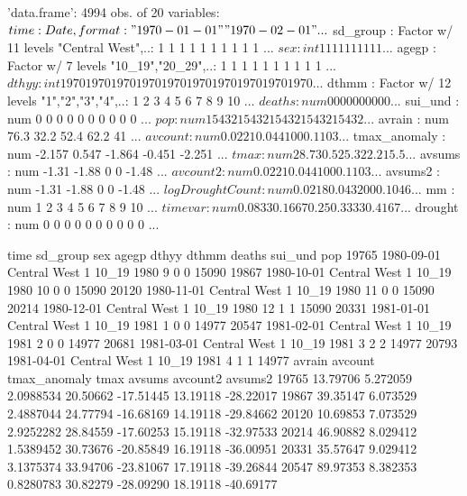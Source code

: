\documentclass[a4paper]{article}                %
\begin{document}
\begin{Schunk}
\begin{Soutput}
'data.frame':	4994 obs. of  20 variables:
 $ time           : Date, format: "1970-01-01" "1970-02-01" ...
 $ sd_group       : Factor w/ 11 levels "Central West",..: 1 1 1 1 1 1 1 1 1 1 ...
 $ sex            : int  1 1 1 1 1 1 1 1 1 1 ...
 $ agegp          : Factor w/ 7 levels "10_19","20_29",..: 1 1 1 1 1 1 1 1 1 1 ...
 $ dthyy          : int  1970 1970 1970 1970 1970 1970 1970 1970 1970 1970 ...
 $ dthmm          : Factor w/ 12 levels "1","2","3","4",..: 1 2 3 4 5 6 7 8 9 10 ...
 $ deaths         : num  0 0 0 0 0 0 0 0 0 0 ...
 $ sui_und        : num  0 0 0 0 0 0 0 0 0 0 ...
 $ pop            : num  15432 15432 15432 15432 15432 ...
 $ avrain         : num  76.3 32.2 52.4 62.2 41 ...
 $ avcount        : num  0.0221 0.0441 0 0 0.1103 ...
 $ tmax_anomaly   : num  -2.157 0.547 -1.864 -0.451 -2.251 ...
 $ tmax           : num  28.7 30.5 25.3 22.2 15.5 ...
 $ avsums         : num  -1.31 -1.88 0 0 -1.48 ...
 $ avcount2       : num  0.0221 0.0441 0 0 0.1103 ...
 $ avsums2        : num  -1.31 -1.88 0 0 -1.48 ...
 $ logDroughtCount: num  0.0218 0.0432 0 0 0.1046 ...
 $ mm             : num  1 2 3 4 5 6 7 8 9 10 ...
 $ timevar        : num  0.0833 0.1667 0.25 0.3333 0.4167 ...
 $ drought        : num  0 0 0 0 0 0 0 0 0 0 ...
\end{Soutput}
\begin{Soutput}
            time     sd_group sex agegp dthyy dthmm deaths sui_und   pop
19765 1980-09-01 Central West   1 10_19  1980     9      0       0 15090
19867 1980-10-01 Central West   1 10_19  1980    10      0       0 15090
20120 1980-11-01 Central West   1 10_19  1980    11      0       0 15090
20214 1980-12-01 Central West   1 10_19  1980    12      1       1 15090
20331 1981-01-01 Central West   1 10_19  1981     1      0       0 14977
20547 1981-02-01 Central West   1 10_19  1981     2      0       0 14977
20681 1981-03-01 Central West   1 10_19  1981     3      2       2 14977
20793 1981-04-01 Central West   1 10_19  1981     4      1       1 14977
        avrain  avcount tmax_anomaly     tmax    avsums avcount2   avsums2
19765 13.79706 5.272059    2.0988534 20.50662 -17.51445 13.19118 -28.22017
19867 39.35147 6.073529    2.4887044 24.77794 -16.68169 14.19118 -29.84662
20120 10.69853 7.073529    2.9252282 28.84559 -17.60253 15.19118 -32.97533
20214 46.90882 8.029412    1.5389452 30.73676 -20.85849 16.19118 -36.00951
20331 35.57647 9.029412    3.1375374 33.94706 -23.81067 17.19118 -39.26844
20547 89.97353 8.382353    0.8280783 30.82279 -28.09290 18.19118 -40.69177

\end{Soutput}
\end{Schunk}
\end{document}
